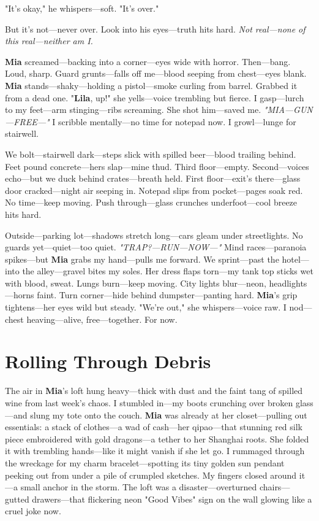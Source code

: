 \documentclass{article}
\begin{document}
"It’s okay," he whispers—soft. "It’s over."

But it’s not—never over. Look into his eyes—truth hits hard. \textit{Not real—none of this real—neither am I.}

\textbf{Mia} screamed—backing into a corner—eyes wide with horror. Then—bang. Loud, sharp. Guard grunts—falls off me—blood seeping from chest—eyes blank. \textbf{Mia} stands—shaky—holding a pistol—smoke curling from barrel. Grabbed it from a dead one. "\textbf{Lila}, up!" she yells—voice trembling but fierce. I gasp—lurch to my feet—arm stinging—ribs screaming. She shot him—saved me. \textit{"MIA—GUN—FREE—"} I scribble mentally—no time for notepad now. I growl—lunge for stairwell.

We bolt—stairwell dark—steps slick with spilled beer—blood trailing behind. Feet pound concrete—hers slap—mine thud. Third floor—empty. Second—voices echo—but we duck behind crates—breath held. First floor—exit’s there—glass door cracked—night air seeping in. Notepad slips from pocket—pages soak red. No time—keep moving. Push through—glass crunches underfoot—cool breeze hits hard.

Outside—parking lot—shadows stretch long—cars gleam under streetlights. No guards yet—quiet—too quiet. \textit{"TRAP?—RUN—NOW—"} Mind races—paranoia spikes—but \textbf{Mia} grabs my hand—pulls me forward. We sprint—past the hotel—into the alley—gravel bites my soles. Her dress flaps torn—my tank top sticks wet with blood, sweat. Lungs burn—keep moving. City lights blur—neon, headlights—horns faint. Turn corner—hide behind dumpster—panting hard. \textbf{Mia}’s grip tightens—her eyes wild but steady. "We’re out," she whispers—voice raw. I nod—chest heaving—alive, free—together. For now.

\section*{Rolling Through Debris}

The air in \textbf{Mia}’s loft hung heavy—thick with dust and the faint tang of spilled wine from last week’s chaos. I stumbled in—my boots crunching over broken glass—and slung my tote onto the couch. \textbf{Mia} was already at her closet—pulling out essentials: a stack of clothes—a wad of cash—her qipao—that stunning red silk piece embroidered with gold dragons—a tether to her Shanghai roots. She folded it with trembling hands—like it might vanish if she let go. I rummaged through the wreckage for my charm bracelet—spotting its tiny golden sun pendant peeking out from under a pile of crumpled sketches. My fingers closed around it—a small anchor in the storm. The loft was a disaster—overturned chairs—gutted drawers—that flickering neon "Good Vibes" sign on the wall glowing like a cruel joke now.
\end{document}
